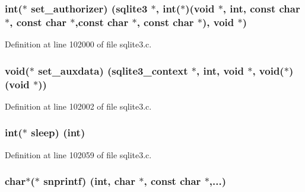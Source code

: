 \subsubsection[{set\+\_\+authorizer}]{\setlength{\rightskip}{0pt plus 5cm}int($\ast$ set\+\_\+authorizer) ({\bf sqlite3} $\ast$, int($\ast$)(void $\ast$, int, const char $\ast$, const char $\ast$,const char $\ast$, const char $\ast$), void $\ast$)}\label{structsqlite3__api__routines_afdbfe4085932e5c2bfadf5b4b8d2278b}


Definition at line 102000 of file sqlite3.\+c.

\hypertarget{structsqlite3__api__routines_a2db853a215f5c43c900061c268897718}{}
\subsubsection[{set\+\_\+auxdata}]{\setlength{\rightskip}{0pt plus 5cm}void($\ast$ set\+\_\+auxdata) ({\bf sqlite3\+\_\+context} $\ast$, int, void $\ast$, void($\ast$)(void $\ast$))}\label{structsqlite3__api__routines_a2db853a215f5c43c900061c268897718}


Definition at line 102002 of file sqlite3.\+c.

\hypertarget{structsqlite3__api__routines_a6a3c1e64ef0dc8389947bc64d17734cc}{}
\subsubsection[{sleep}]{\setlength{\rightskip}{0pt plus 5cm}int($\ast$ sleep) (int)}\label{structsqlite3__api__routines_a6a3c1e64ef0dc8389947bc64d17734cc}


Definition at line 102059 of file sqlite3.\+c.

\hypertarget{structsqlite3__api__routines_a61d6499efb17e9f027d75e9cbe1cc546}{}
\subsubsection[{snprintf}]{\setlength{\rightskip}{0pt plus 5cm}char$\ast$($\ast$ snprintf) (int, char $\ast$, const char $\ast$,...)}\label{structsqlite3__api__routines_a61d6499efb17e9f027d75e9cbe1cc546}


